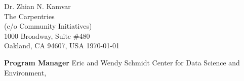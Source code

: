 


\clearpage
\begin{flushright}
  Dr. Zhian N. Kamvar\\
  The Carpentries\\
  (c/o Community Initiatives)\\
  1000 Broadway, Suite \#480\\
  Oakland, CA 94607, USA
  \today
\end{flushright}

\textbf{Program Manager}
Eric and Wendy Schmidt Center for Data Science and Environment,


%

